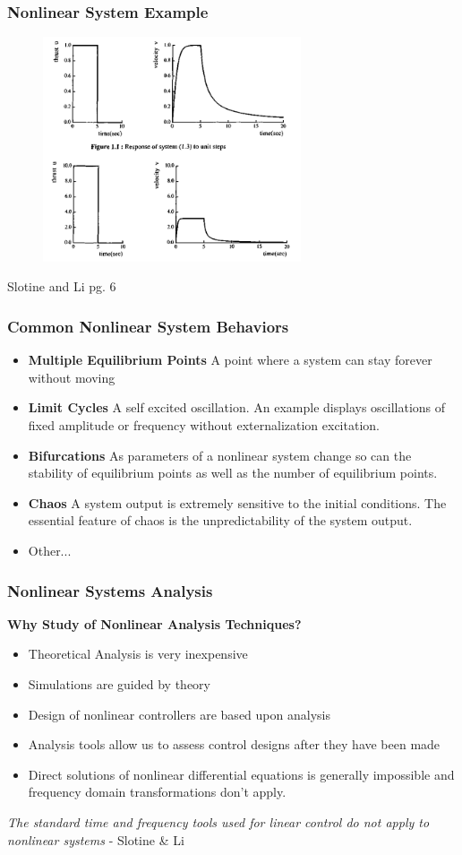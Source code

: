 \documentclass[11pt,handout]{beamer}   %
\begin{document}
\begin{frame}
\frametitle{Nonlinear System Example}
\begin{figure}
\centering
\includegraphics[width = 3in]{NonLinearExample_1.PNG}
\end{figure}
Slotine and Li pg. 6
\end{frame}

\begin{frame}
\frametitle{Common Nonlinear System Behaviors}

\begin{itemize}
\item \textbf{Multiple Equilibrium Points} A point where a system can stay forever without moving
\item \textbf{Limit Cycles} A self excited oscillation. An example displays oscillations of fixed amplitude or frequency without externalization excitation.
\item \textbf{Bifurcations} As parameters of a nonlinear system change so can the stability of equilibrium points as well as the number of equilibrium points.
\item \textbf{Chaos} A system output is extremely sensitive to the initial conditions. The essential feature of chaos is the unpredictability of the system output.
\item Other...
\end{itemize}
\end{frame}


\begin{frame}
\frametitle{Nonlinear Systems Analysis}
\textbf{Why Study of Nonlinear Analysis Techniques?}
\begin{itemize}
\item Theoretical Analysis is very inexpensive
\item Simulations are guided by theory
\item Design of nonlinear controllers are based upon analysis
\item Analysis tools allow us to assess control designs after they have been made
\item Direct solutions of nonlinear differential equations is generally impossible and frequency domain transformations don't apply.
\end{itemize}
\Large{\textit{The standard time and frequency tools used for linear control do not apply to nonlinear systems} - Slotine \& Li}
\end{frame}
\end{document}
